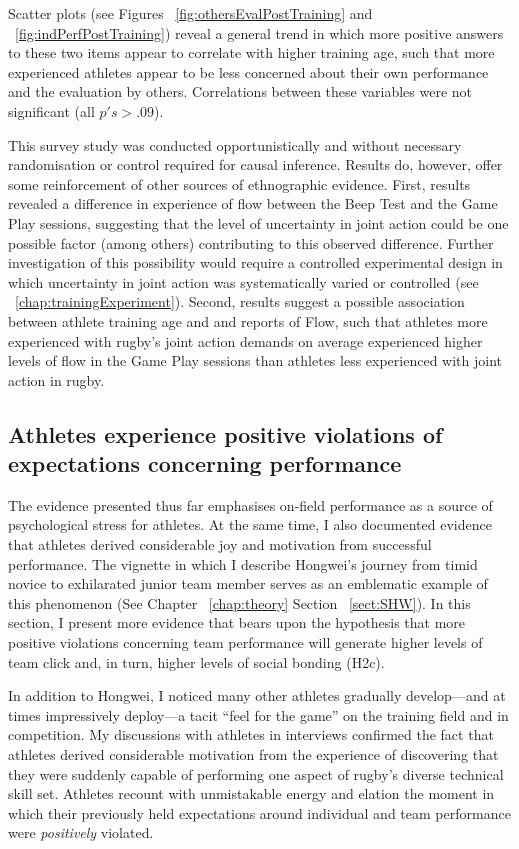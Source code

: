\begin{CJK}{UTF8}{gbsn}
Scatter plots (see Figures ~\ref{fig:othersEvalPostTraining} and ~\ref{fig:indPerfPostTraining}) reveal a general trend in which more positive answers to these two items appear to correlate with higher training age, such that more experienced athletes appear to be less concerned about their own performance and the evaluation by others.  Correlations between these variables were not significant (all $p's > .09$).

This survey study was conducted opportunistically and without necessary randomisation or control required for causal inference.  Results do, however, offer some reinforcement of other sources of ethnographic evidence.  First, results revealed a difference in experience of flow between the Beep Test and the Game Play sessions, suggesting that the level of uncertainty in joint action could be one possible factor (among others) contributing to this observed difference.  Further investigation of this possibility would require a controlled experimental design in which uncertainty in joint action was systematically varied or controlled (see ~\ref{chap:trainingExperiment}).  Second, results suggest a possible association between athlete training age and and reports of Flow, such that athletes more experienced with rugby's joint action demands on average experienced higher levels of flow in the Game Play sessions than athletes less experienced with joint action in rugby.




\subsection{Athletes experience positive violations of expectations concerning performance\label{sect:expectationViolation}}
The evidence presented thus far emphasises on-field performance as a source of psychological stress for athletes.  At the same time, I also documented evidence that athletes derived considerable joy and motivation from successful performance.  The vignette in which I describe Hongwei's journey from timid novice to exhilarated junior team member serves as an emblematic example of this phenomenon (See Chapter ~\ref{chap:theory} Section ~\ref{sect:SHW}).  In this section, I present more evidence that bears upon the hypothesis that more positive violations concerning team performance will generate higher levels of team click and, in turn, higher levels of social bonding (H2c).

In addition to Hongwei, I noticed many other athletes gradually develop---and at times impressively deploy---a tacit ``feel for the game'' on the training field and in competition.  My discussions with athletes in interviews confirmed the fact that athletes derived considerable motivation from the experience of discovering that they were suddenly capable of performing one aspect of rugby's diverse technical skill set.  Athletes recount with unmistakable energy and elation the moment in which their previously held expectations around individual and team performance were \textit{positively} violated.


\end{CJK}
